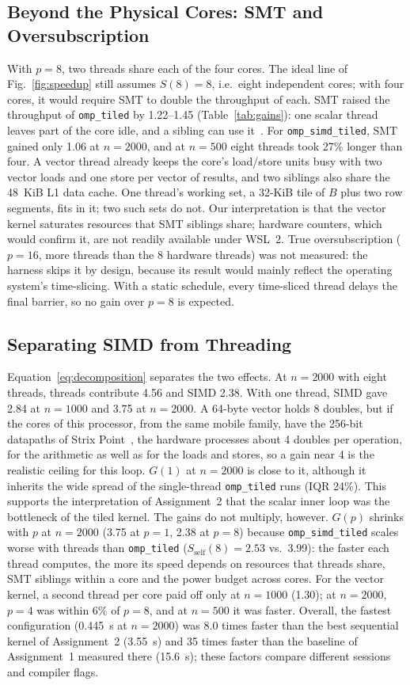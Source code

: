 \documentclass[conference,a4paper]{IEEEtran}
\newcommand{\code}[1]{\texttt{#1}}
\newcommand{\ompk}{\code{omp\_tiled}}
\newcommand{\simdk}{\code{omp\_simd\_tiled}}
\newcommand{\Sself}{S_{\mathrm{self}}}
\begin{document}
\subsection{Beyond the Physical Cores: SMT and Oversubscription}
\label{sec:disc-smt}
With $p = 8$, two threads share each of the four cores. The ideal line of
Fig.~\ref{fig:speedup} still assumes $S(8) = 8$, i.e.\ eight independent
cores; with four cores, it would require SMT to double the throughput of each. SMT raised the throughput of \ompk{} by
1.22--1.45 (Table~\ref{tab:gains}): one scalar thread leaves part of the core
idle, and a sibling can use it~\cite{tullsen1995}. For \simdk{}, SMT gained
only 1.06 at $n = 2000$, and at $n = 500$ eight threads took 27\% longer than
four. A vector thread already
keeps the core's load/store units busy with two vector loads and one store per
vector of results, and two siblings also share the 48~KiB L1 data cache. One
thread's working set, a 32-KiB tile of $B$ plus two row segments, fits in it;
two such sets do not. Our interpretation is that the vector kernel saturates
resources that SMT siblings share; hardware counters, which would confirm it,
are not readily available under WSL~2. True oversubscription ($p = 16$, more
threads than the 8 hardware threads) was not measured: the harness skips it by
design, because its result would mainly reflect the operating system's
time-slicing. With a static schedule, every time-sliced thread delays the
final barrier, so no gain over $p = 8$ is expected.

\subsection{Separating SIMD from Threading}
\label{sec:disc-simd}
Equation~\eqref{eq:decomposition} separates the two effects. At $n = 2000$
with eight threads, threads contribute 4.56 and SIMD 2.38. With one thread,
SIMD gave 2.84 at $n = 1000$ and 3.75 at $n = 2000$. A 64-byte vector holds 8
doubles, but if the cores of this processor, from the same mobile family, have
the 256-bit datapaths of Strix Point~\cite{tpu2024}, the hardware processes
about 4 doubles per operation, for the arithmetic as well as for the loads and
stores, so a gain near 4 is the realistic ceiling for this loop. $G(1)$ at
$n = 2000$ is close to it, although it inherits the wide spread of the
single-thread \ompk{} runs (IQR 24\%). This supports the interpretation of
Assignment~2 that the scalar inner loop was the bottleneck of the tiled kernel.
The gains do not multiply, however. $G(p)$ shrinks with $p$ at $n = 2000$
(3.75 at $p = 1$, 2.38 at $p = 8$) because \simdk{} scales worse with threads
than \ompk{} ($\Sself(8) = 2.53$ vs.\ 3.99): the faster each thread computes,
the more its speed depends on resources that threads share, SMT siblings
within a core and the power budget across cores. For the vector kernel, a
second thread per core paid off only at $n = 1000$ (1.30); at $n = 2000$,
$p = 4$ was within 6\% of $p = 8$, and at $n = 500$ it was faster. Overall, the
fastest configuration (0.445~s at $n = 2000$) was 8.0 times faster than the
best sequential kernel of Assignment~2 (3.55~s) and 35 times faster than the
baseline of Assignment~1 measured there (15.6~s); these factors compare
different sessions and compiler flags.
\end{document}
